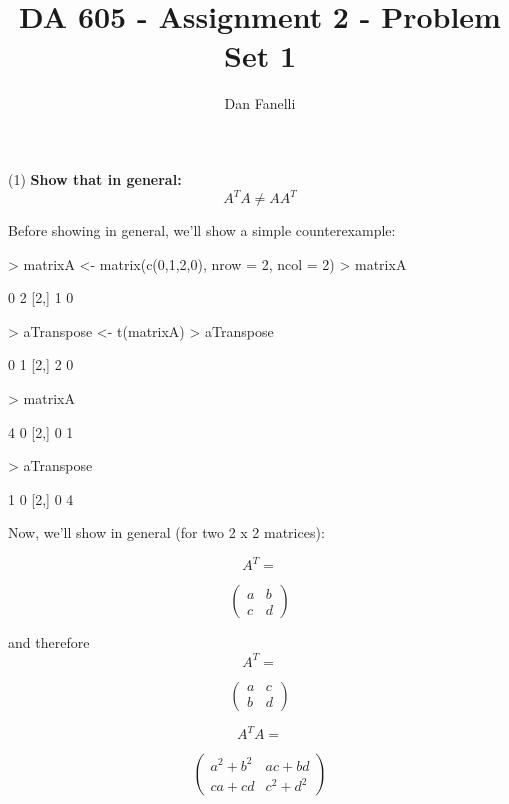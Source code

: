 \documentclass{article}
\title { DA 605 - Assignment 2 - Problem Set 1}
\author { Dan Fanelli }
\begin{document}
\maketitle

(1) \textbf{Show that in general:
\[A^{T}A \neq AA^{T}\]
}

Before showing in general, we'll show a simple counterexample:

\begin{Schunk}
\begin{Sinput}
> matrixA <- matrix(c(0,1,2,0), nrow = 2, ncol = 2)
> matrixA
\end{Sinput}
\begin{Soutput}
     [,1] [,2]
[1,]    0    2
[2,]    1    0
\end{Soutput}
\begin{Sinput}
> aTranspose <- t(matrixA)
> aTranspose
\end{Sinput}
\begin{Soutput}
     [,1] [,2]
[1,]    0    1
[2,]    2    0
\end{Soutput}
\begin{Sinput}
> matrixA %*% aTranspose
\end{Sinput}
\begin{Soutput}
     [,1] [,2]
[1,]    4    0
[2,]    0    1
\end{Soutput}
\begin{Sinput}
> aTranspose %*% matrixA
\end{Sinput}
\begin{Soutput}
     [,1] [,2]
[1,]    1    0
[2,]    0    4
\end{Soutput}
\end{Schunk}

Now, we'll show in general (for two 2 x 2 matrices):

\[A^{T} = \]

\[ \left( \begin{array}{ccc}
a & b \\
c & d \end{array} \right)\] 

and therefore \[A^{T} = \]

\[ \left( \begin{array}{ccc}
a & c \\
b & d \end{array} \right)\] 

\[A^{T}A = \]

\[ \left( \begin{array}{ccc}
a^2+b^2 & ac+bd \\
ca+cd & c^2+d^2 \end{array} \right)\] 
\end{document}
